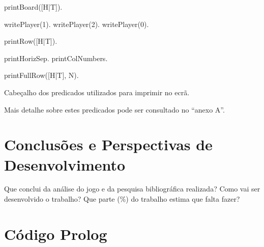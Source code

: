 \documentclass[15pt,a4paper]{article}
\begin{document}
\begin{code}[H]
	\begin{verbatimtab}

printBoard([H|T]).

writePlayer(1).
writePlayer(2).
writePlayer(0).

printRow([H|T]).
	
printHorizSep.
printColNumbers.

printFullRow([H|T], N).
\end{verbatimtab}
\caption{Cabeçalho dos predicados utilizados para imprimir no ecrã.}
\end{code}

Mais detalhe sobre estes predicados pode ser consultado no ``anexo A''.





\section{Conclusões e Perspectivas de Desenvolvimento}
Que conclui da análise do jogo e da pesquisa bibliográfica realizada? Como vai ser desenvolvido o trabalho? Que parte (\%) do trabalho estima que falta fazer?

\clearpage

\renewcommand\refname{Bibliografia}





\newpage
\appendix
\section{Código Prolog}
\end{document}
